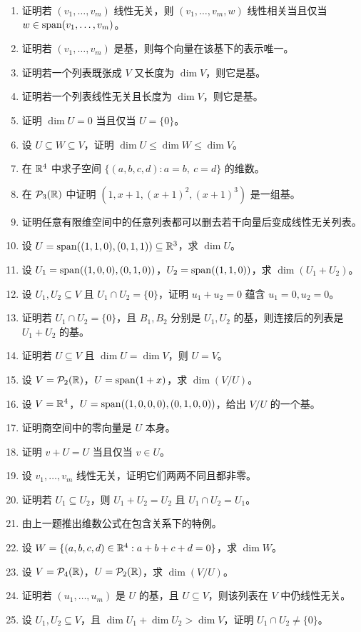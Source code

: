 \begin{enumerate}[label=\textbf{\medium\ \arabic*.}, leftmargin=3em]
\item 证明若 $(v_1,\dots,v_m)$ 线性无关，则 $(v_1,\dots,v_m,w)$ 线性相关当且仅当 $w\in\operatorname{span}(v_1,\dots,v_m)$。
\item 证明若 $(v_1,\dots,v_m)$ 是基，则每个向量在该基下的表示唯一。
\item 证明若一个列表既张成 $V$ 又长度为 $\dim V$，则它是基。
\item 证明若一个列表线性无关且长度为 $\dim V$，则它是基。
\item 证明 $\dim U=0$ 当且仅当 $U=\{0\}$。
\item 设 $U\subseteq W\subseteq V$，证明 $\dim U\le \dim W\le \dim V$。
\item 在 $\mathbb{R}^4$ 中求子空间 $\{(a,b,c,d):a=b,\ c=d\}$ 的维数。
\item 在 $\mathcal{P}_3(\mathbb{R})$ 中证明 $(1,x+1,(x+1)^2,(x+1)^3)$ 是一组基。
\item 证明任意有限维空间中的任意列表都可以删去若干向量后变成线性无关列表。
\item 设 $U=\operatorname{span}((1,1,0),(0,1,1))\subseteq\mathbb{R}^3$，求 $\dim U$。
\item 设 $U_1=\operatorname{span}((1,0,0),(0,1,0))$，$U_2=\operatorname{span}((1,1,0))$，求 $\dim(U_1+U_2)$。
\item 设 $U_1,U_2\subseteq V$ 且 $U_1\cap U_2=\{0\}$，证明 $u_1+u_2=0$ 蕴含 $u_1=0,u_2=0$。
\item 证明若 $U_1\cap U_2=\{0\}$，且 $B_1,B_2$ 分别是 $U_1,U_2$ 的基，则连接后的列表是 $U_1+U_2$ 的基。
\item 证明若 $U\subseteq V$ 且 $\dim U=\dim V$，则 $U=V$。
\item 设 $V=\mathcal{P}_2(\mathbb{R})$，$U=\operatorname{span}(1+x)$，求 $\dim(V/U)$。
\item 设 $V=\mathbb{R}^4$，$U=\operatorname{span}((1,0,0,0),(0,1,0,0))$，给出 $V/U$ 的一个基。
\item 证明商空间中的零向量是 $U$ 本身。
\item 证明 $v+U=U$ 当且仅当 $v\in U$。
\item 设 $v_1,\dots,v_m$ 线性无关，证明它们两两不同且都非零。
\item 证明若 $U_1\subseteq U_2$，则 $U_1+U_2=U_2$ 且 $U_1\cap U_2=U_1$。
\item 由上一题推出维数公式在包含关系下的特例。
\item 设 $W=\{(a,b,c,d)\in\mathbb{R}^4:a+b+c+d=0\}$，求 $\dim W$。
\item 设 $V=\mathcal{P}_4(\mathbb{R})$，$U=\mathcal{P}_2(\mathbb{R})$，求 $\dim(V/U)$。
\item 证明若 $(u_1,\dots,u_m)$ 是 $U$ 的基，且 $U\subseteq V$，则该列表在 $V$ 中仍线性无关。
\item 设 $U_1,U_2\subseteq V$，且 $\dim U_1+\dim U_2>\dim V$，证明 $U_1\cap U_2\neq\{0\}$。
\end{enumerate}

